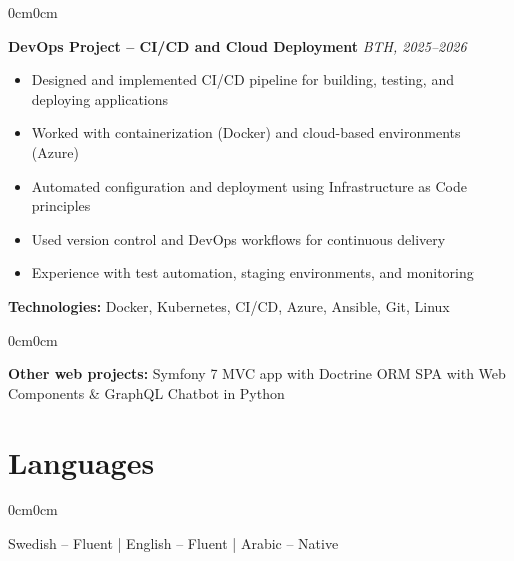 \documentclass[10pt, letterpaper]{article}
\newenvironment{highlights}{
    \begin{itemize}[topsep=0.10cm, parsep=0.10cm, partopsep=0pt, itemsep=0pt, leftmargin=10pt]
}{
    \end{itemize}
}
\newenvironment{onecolentry}{
    \begin{adjustwidth}{0cm}{0cm}
}{
    \end{adjustwidth}
}
\begin{document}
    \vspace{0.2cm}

    \begin{onecolentry}
        \textbf{DevOps Project -- CI/CD and Cloud Deployment} \hfill \textit{BTH, 2025--2026}
        \begin{highlights}
            \item Designed and implemented CI/CD pipeline for building, testing, and deploying applications
            \item Worked with containerization (Docker) and cloud-based environments (Azure)
            \item Automated configuration and deployment using Infrastructure as Code principles
            \item Used version control and DevOps workflows for continuous delivery
            \item Experience with test automation, staging environments, and monitoring
        \end{highlights}
        \textbf{Technologies:} Docker, Kubernetes, CI/CD, Azure, Ansible, Git, Linux
    \end{onecolentry}

    \vspace{0.2cm}

    \begin{onecolentry}
        \textbf{Other web projects:} Symfony 7 MVC app with Doctrine ORM \textbullet{} SPA with Web Components \& GraphQL \textbullet{} Chatbot in Python
    \end{onecolentry}

    \section{Languages}
    \begin{onecolentry}
        Swedish -- Fluent \quad | \quad English -- Fluent \quad | \quad Arabic -- Native
    \end{onecolentry}
\end{document}
